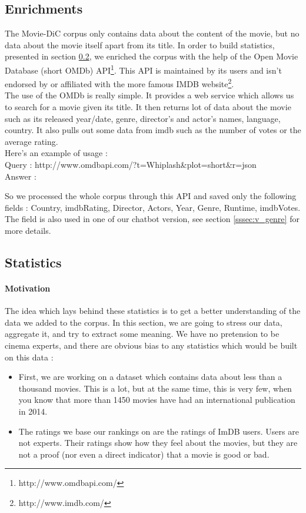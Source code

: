 \subsection{Enrichments}
\label{ssec:enrich}
The Movie-DiC corpus only contains data about the content of the movie, but no data about the movie itself apart from its title. In order to build statistics, presented in section \ref{ssec:stats}, we enriched the corpus with the help of the Open Movie Database (short OMDb) API\footnote{http://www.omdbapi.com/}. This API is maintained by its users and isn't endorsed by or affiliated with the more famous IMDB website\footnote{http://www.imdb.com/}.\\
The use of the OMDb is really simple. It provides a web service which allows us to search for a movie given its title. It then returns lot of data about the movie such as its released year/date, genre, director's and actor's names, language, country. It also pulls out some data from imdb such as the number of votes or the average rating.\\
Here's an example of usage :\\
Query : http://www.omdbapi.com/?t=Whiplash\&plot=short\&r=json\\
Answer :

So we processed the whole corpus through this API and saved only the following fields : Country, imdbRating, Director, Actors, Year, Genre, Runtime, imdbVotes. \\
The  field is also used in one of our chatbot version, see section \ref{sssec:v_genre} for more details.

\newpage
\subsection{Statistics}
\label{ssec:stats}

\paragraph{Motivation}
\label{par:Motivation}
The idea which lays behind these statistics is to get a better understanding of the data we added to the corpus.
In this section, we are going to stress our data, aggregate it, and try to extract some meaning.
We have no pretension to be cinema experts, and there are obvious bias to any statistics which would be built on this data :
\begin{itemize}
    \item First, we are working on a dataset which contains data about less than a thousand movies.
    This is a lot, but at the same time, this is very few, when you know that more than 1450 movies have had an international publication in 2014.
    \item The ratings we base our rankings on are the ratings of ImDB users. Users are not experts.
    Their ratings show how they feel about the movies, but they are not a proof (nor even a direct indicator) that a movie is good or bad.
\end{itemize}

